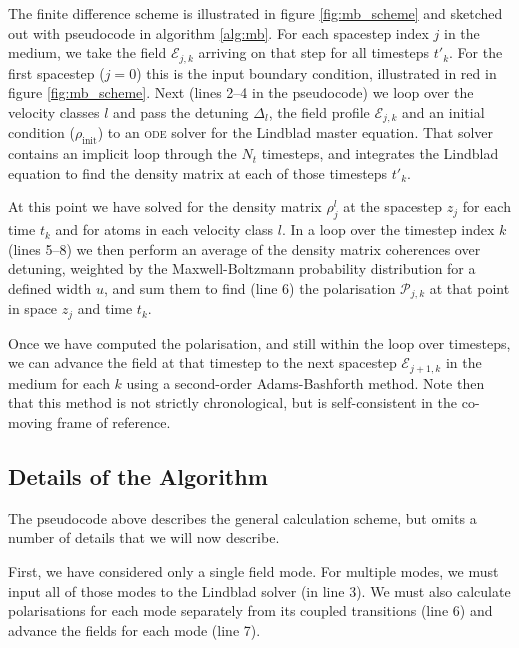     The finite difference scheme is illustrated in figure \ref{fig:mb_scheme}
    and sketched out with pseudocode in algorithm \ref{alg:mb}. For each
    spacestep index $j$ in the medium, we take the field $\mathcal{E}_{j,k}$
    arriving on that step for all timesteps $t'_k$. For the first spacestep
    ($j\!=\!0$) this is the input boundary condition, illustrated in red in
    figure \ref{fig:mb_scheme}. Next (lines 2--4 in the pseudocode) we loop over
    the velocity classes $l$ and pass the detuning $\Delta_l$, the field profile
    $\mathcal{E}_{j,k}$ and an initial condition ($\rho_\mathrm{init}$) to an
    \textsc{ode} solver for the Lindblad master equation. That solver contains
    an implicit loop through the $N_t$ timesteps, and integrates the Lindblad
    equation to find the density matrix at each of those timesteps $t'_k$.

    At this point we have solved for the density matrix $\rho^l_j$ at the
    spacestep $z_j$ for each time $t_k$ and for atoms in each velocity class
    $l$. In a loop over the timestep index $k$ (lines 5--8) we then perform an
    average of the density matrix coherences over detuning, weighted by the
    Maxwell-Boltzmann probability distribution for a defined width $u$, and sum
    them to find (line 6) the polarisation $\mathcal{P}_{j,k}$ at that point in
    space $z_j$ and time $t_k$.

    Once we have computed the polarisation, and still within the loop over
    timesteps, we can advance the field at that timestep to the next spacestep
    $\mathcal{E}_{j+1,k}$ in the medium for each $k$ using a second-order
    Adams-Bashforth method. Note then that this method is not strictly
    chronological, but is self-consistent in the co-moving frame of reference.

    \subsection{Details of the Algorithm}

    The pseudocode above describes the general calculation scheme, but omits a
    number of details that we will now describe.

    First, we have considered only a single field mode. For multiple modes, we
    must input all of those modes to the Lindblad solver (in line 3). We must
    also calculate polarisations for each mode separately from its coupled
    transitions (line 6) and advance the fields for each mode (line 7).

